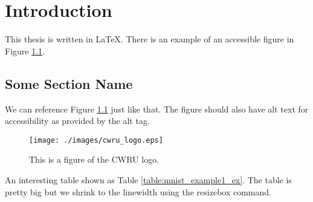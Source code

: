 \chapter{Introduction}

This thesis is written in \LaTeX\cite{knuthwebsite}. There is an example of
an accessible figure in Figure \ref{fig:logo}.

\lipsum[3]

\section{Some Section Name}

\lipsum[1]

We can reference Figure \ref{fig:logo} just like that. The figure should also
have alt text for accessibility as provided by the alt tag.

\begin{figure}[hbt!]
    \centering
    \texttt{[image: ./images/cwru\_logo.eps]}
    \caption{This is a figure of the CWRU logo.}
    \label{fig:logo}
\end{figure}

\lipsum[1]

An interesting table shown as Table \ref{table:mnist_example1_ex}. The table is
pretty big but we shrink to the linewidth using the resizebox command.

